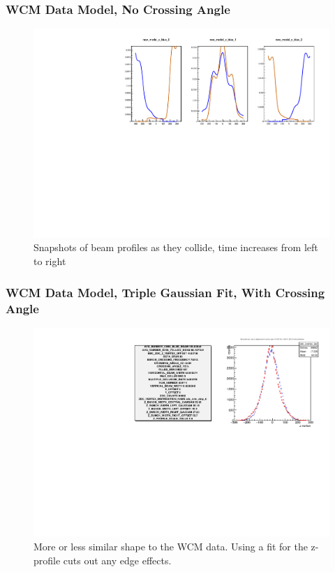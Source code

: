 \begin{frame}
\frametitle{WCM Data Model, No Crossing Angle}
\begin{figure}
\begin{center}
\includegraphics[width=\linewidth]{../OverlapTest/figs/359711_model0_noangle_zprofile.pdf}
\end{center}
\caption{Snapshots of beam profiles as they collide, time increases from left to right }
\label{fig:359711_model0_noangle_zprofile}
\end{figure}
\end{frame}


\begin{frame}
\frametitle{WCM Data Model, Triple Gaussian Fit, With Crossing Angle}
\begin{figure}
\begin{center}
\includegraphics[width=\linewidth]{../OverlapTest/figs/359711_model2_angle_vertex.pdf}
\end{center}
\caption{More or less similar shape to the WCM data. Using a fit for the
z-profile cuts out any edge effects.}
\label{fig:359711_model2_angle_vertex}
\end{figure}
\end{frame}


